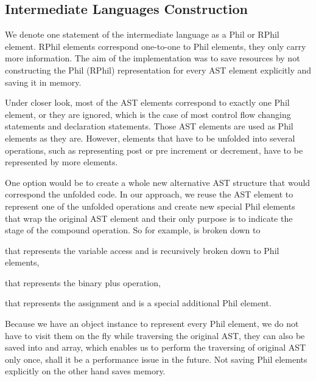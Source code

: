     \subsection{Intermediate Languages Construction}
        We denote one statement of the intermediate language as
        a Phil or RPhil element. RPhil elements correspond 
        one-to-one to Phil elements, they only carry more 
        information. The aim of the implementation was to 
        save resources by not constructing the Phil (RPhil) 
        representation for every AST element explicitly and 
        saving it in memory.
        
        Under closer look, most of the AST elements correspond to 
        exactly one Phil element, or they are ignored, 
        which is the case of most control flow changing statements 
        and declaration statements. Those AST elements are used as 
        Phil elements as they are. However, elements that have to be 
        unfolded into several operations, such as  
        representing post or pre increment or decrement, have to 
        be represented by more elements. 
        
        One option would be to create a whole new alternative 
        AST structure that would correspond the unfolded code. 
        In our approach, we reuse the AST element to represent one 
        of the unfolded operations and create new special Phil 
        elements that wrap the original AST element and their 
        only purpose is to indicate the stage of the compound 
        operation. So for example,  is broken down 
        to 
        \begin{itemize*}
            \item {} that represents the variable access and 
                is recursively broken down to Phil elements, 
            \item {} that represents the binary plus operation,
            \item {} that represents the assignment 
                and is a special additional Phil element.
        \end{itemize*}
        
        Because we have an object instance to represent every Phil element, 
        we do not have to visit them on the fly while traversing the original AST, 
        they can also be saved into and array, which enables us to perform the 
        traversing of original AST only once, shall it be a performance issue 
        in the future. Not saving Phil elements explicitly on the other hand 
        saves memory.
        

